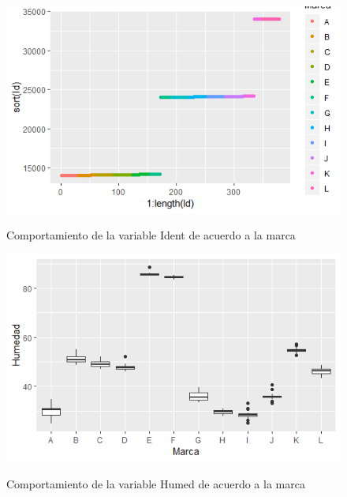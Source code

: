 \documentclass[pdf]{beamer}
\begin{document}
\begin{frame}
\begin{figure}[h]
\centering
\includegraphics[scale=1]{images/ident.png} 
\label{i2}
\caption{Comportamiento de la variable Ident de acuerdo a la marca}
\end{figure}
\end{frame}


\begin{frame}
\begin{figure}[h]
\centering
\includegraphics[scale=1]{images/humed.png} 
\label{i3}
\caption{Comportamiento de la variable Humed de acuerdo a la marca}
\end{figure}
\end{frame}
\end{document}

